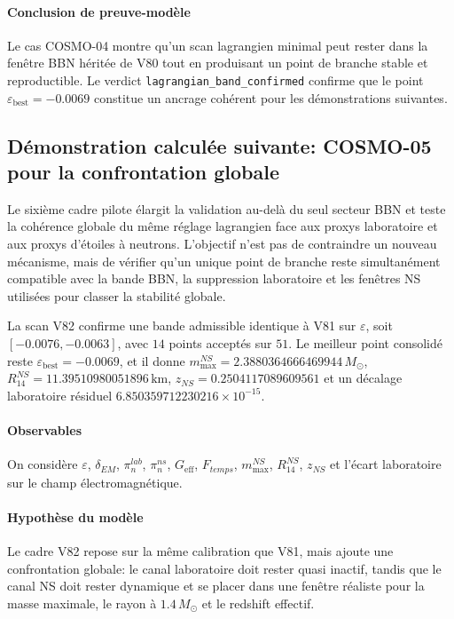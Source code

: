 \documentclass[11pt,a4paper]{article}
\begin{document}
\paragraph{Conclusion de preuve-modèle}
Le cas COSMO-04 montre qu'un scan lagrangien minimal peut rester dans la fenêtre BBN héritée de V80 tout en produisant un point de branche stable et reproductible. Le verdict \texttt{lagrangian\_band\_confirmed} confirme que le point $\varepsilon_{\mathrm{best}}=-0.0069$ constitue un ancrage cohérent pour les démonstrations suivantes.

\subsection{Démonstration calculée suivante: COSMO-05 pour la confrontation globale}
Le sixième cadre pilote élargit la validation au-delà du seul secteur BBN et teste la cohérence globale du même réglage lagrangien face aux proxys laboratoire et aux proxys d'étoiles à neutrons. L'objectif n'est pas de contraindre un nouveau mécanisme, mais de vérifier qu'un unique point de branche reste simultanément compatible avec la bande BBN, la suppression laboratoire et les fenêtres NS utilisées pour classer la stabilité globale.

La scan V82 confirme une bande admissible identique à V81 sur $\varepsilon$, soit $[-0.0076,-0.0063]$, avec $14$ points acceptés sur $51$. Le meilleur point consolidé reste $\varepsilon_{\mathrm{best}}=-0.0069$, et il donne $m_{\max}^{NS}=2.3880364666469944\,M_\odot$, $R_{14}^{NS}=11.39510980051896\,\mathrm{km}$, $z_{NS}=0.2504117089609561$ et un décalage laboratoire résiduel $6.850359712230216\times 10^{-15}$.

\paragraph{Observables}
On considère $\varepsilon$, $\delta_{EM}$, $\pi_n^{lab}$, $\pi_n^{ns}$, $G_{\mathrm{eff}}$, $F_{temps}$, $m_{\max}^{NS}$, $R_{14}^{NS}$, $z_{NS}$ et l'écart laboratoire sur le champ électromagnétique.

\paragraph{Hypothèse du modèle}
Le cadre V82 repose sur la même calibration que V81, mais ajoute une confrontation globale: le canal laboratoire doit rester quasi inactif, tandis que le canal NS doit rester dynamique et se placer dans une fenêtre réaliste pour la masse maximale, le rayon à $1.4\,M_\odot$ et le redshift effectif.
\end{document}
